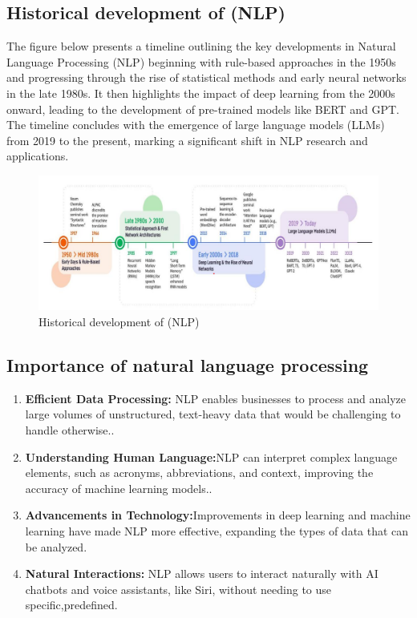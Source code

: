 \subsection{Historical development of (NLP)}
The figure below presents a timeline outlining the key developments in Natural Language Processing (NLP)  beginning with rule-based approaches in the 1950s and progressing through the rise of statistical methods and early neural networks in the late 1980s. It then highlights the impact of deep learning from the 2000s onward, leading to the development of pre-trained models like BERT and GPT. The timeline concludes with the emergence of large language models (LLMs) from 2019 to the present, marking a significant shift in NLP research and applications.
\begin{figure}[htbp]
	\centerline{\includegraphics[scale=.7]{Figures/the_historyOf_nlp.png}}
	\caption{Historical development of (NLP)}
	\label{the_historyOf_nlp.png}
\end{figure}

\subsection{Importance of natural language processing}

\begin{enumerate}
	\item \textbf{Efficient Data Processing:} NLP enables businesses to process and analyze large volumes of unstructured, text-heavy data that would be challenging to handle otherwise..

	\item \textbf{Understanding Human Language:}NLP can interpret complex language elements, such as acronyms, abbreviations, and context, improving the accuracy of machine learning models..
	
	\item \textbf{Advancements in Technology:}Improvements in deep learning and machine learning have made NLP more effective, expanding the types of data that can be analyzed.
	
	\item \textbf{Natural Interactions:} NLP allows users to interact naturally with AI chatbots and voice assistants, like Siri, without needing to use specific,predefined\cite{techtarget_nlp}.
	
\end{enumerate}

